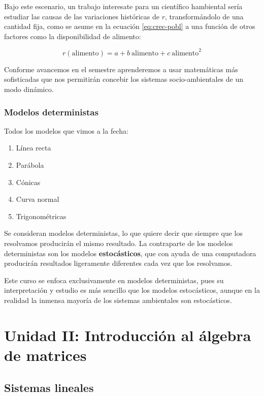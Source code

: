 \documentclass[
]{book}
\providecommand{\tightlist}{%
  \setlength{\itemsep}{0pt}\setlength{\parskip}{0pt}}
\begin{document}
Bajo este escenario, un trabajo interesate para un científico hambiental sería estudiar las causas de las variaciones históricas de \(r\), transformándolo de una cantidad fija, como se asume en la
ecuación \eqref{eq:crec-pobl} a una función de otros factores como la disponibilidad de alimento:

\[r(\mathrm{alimento}) = a + b \mathrm{\ alimento} + c \mathrm{\ alimento}^2\]

Conforme avancemos en el semestre aprenderemos a usar matemáticas más sofisticadas que nos permitirán concebir los sistemas socio-ambientales de un modo dinámico.

\hypertarget{modelos-deterministas}{%
\subsection{Modelos deterministas}\label{modelos-deterministas}}

Todos los modelos que vimos a la fecha:

\begin{enumerate}
\def\labelenumi{\arabic{enumi}.}
\tightlist
\item
  Línea recta
\item
  Parábola
\item
  Cónicas
\item
  Curva normal
\item
  Trigonométricas
\end{enumerate}

Se consideran modelos deterministas, lo que quiere decir que siempre que los resolvamos producirán el mismo resultado. La contraparte de los modelos deterministas son los modelos \textbf{estocásticos}, que con ayuda de una computadora producirán resultados ligeramente diferentes cada vez que los resolvamos.

Este curso se enfoca exclusivamente en modelos deterministas, pues su interpretación y estudio es más sencillo que los modelos estocásticos, aunque en la realidad la inmensa mayoría de los sistemas ambientales son estocásticos.

\hypertarget{unidad-ii-introducciuxf3n-al-uxe1lgebra-de-matrices}{%
\chapter{Unidad II: Introducción al álgebra de matrices}\label{unidad-ii-introducciuxf3n-al-uxe1lgebra-de-matrices}}

\hypertarget{sistemas-lineales}{%
\section{Sistemas lineales}\label{sistemas-lineales}}
\end{document}
